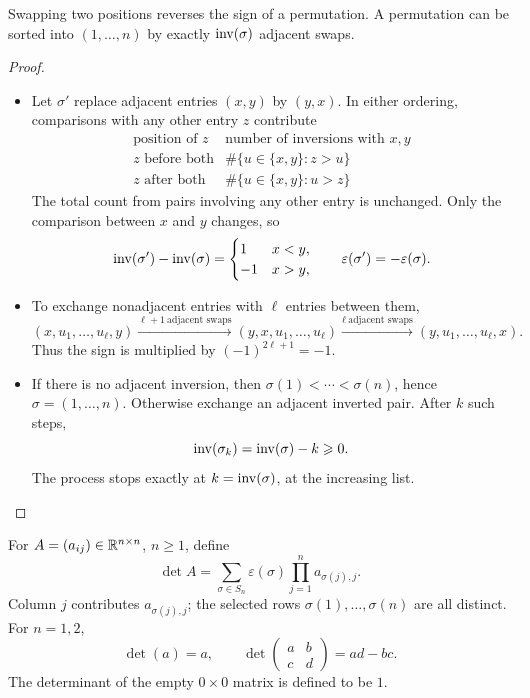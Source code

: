 \begin{proposition}\label{prop:05:sign}
Swapping two positions reverses the sign of a permutation.
A permutation can be sorted into \((1,\ldots,n)\) by exactly
\(\operatorname{inv}(\sigma)\) adjacent swaps.
\end{proposition}
\begin{proof}
\begin{itemize}
\item Let \(\sigma'\) replace adjacent entries \((x,y)\) by \((y,x)\).
  In either ordering, comparisons with any other entry \(z\) contribute
  \[
  \begin{array}{c|c}
  \text{position of }z&\text{number of inversions with }x,y\\ \hline
  z\text{ before both}&\#\{u\in\{x,y\}:z>u\}\\
  z\text{ after both}&\#\{u\in\{x,y\}:u>z\}
  \end{array}
  \]
  The total count from pairs involving any other entry is unchanged.
  Only the comparison between \(x\) and \(y\) changes, so
  \[
  \operatorname{inv}(\sigma')-\operatorname{inv}(\sigma)
   =\begin{cases}1&x<y,\\-1&x>y,\end{cases}
  \qquad \varepsilon(\sigma')=-\varepsilon(\sigma).
  \]
\item To exchange nonadjacent entries with \(\ell\) entries between them,
  \[
  (x,u_1,\ldots,u_\ell,y)
  \xrightarrow{\ell+1\ \text{adjacent swaps}}
  (y,x,u_1,\ldots,u_\ell)
  \xrightarrow{\ell\ \text{adjacent swaps}}
  (y,u_1,\ldots,u_\ell,x).
  \]
  Thus the sign is multiplied by \((-1)^{2\ell+1}=-1\).
\item If there is no adjacent inversion, then
  \(\sigma(1)<\cdots<\sigma(n)\), hence \(\sigma=(1,\ldots,n)\).
  Otherwise exchange an adjacent inverted pair. After \(k\) such steps,
  \[
  \operatorname{inv}(\sigma_k)=\operatorname{inv}(\sigma)-k\geqslant0.
  \]
  The process stops exactly at \(k=\operatorname{inv}(\sigma)\), at the increasing list.
\end{itemize}
\end{proof}

For \(A=(a_{ij})\in\mathbb R^{n\times n}\),
\(n\geqslant1\), define
\[
\boxed{\det A=\sum_{\sigma\in S_n}\varepsilon(\sigma)
                \prod_{j=1}^n a_{\sigma(j),j}}.
\]
Column \(j\) contributes \(a_{\sigma(j),j}\); the selected rows
\(\sigma(1),\ldots,\sigma(n)\) are all distinct. For \(n=1,2\),
\[
\det(a)=a,\qquad
\det\begin{pmatrix}a&b\\c&d\end{pmatrix}=ad-bc.
\]
The determinant of the empty \(0\times0\) matrix is defined to be \(1\).

